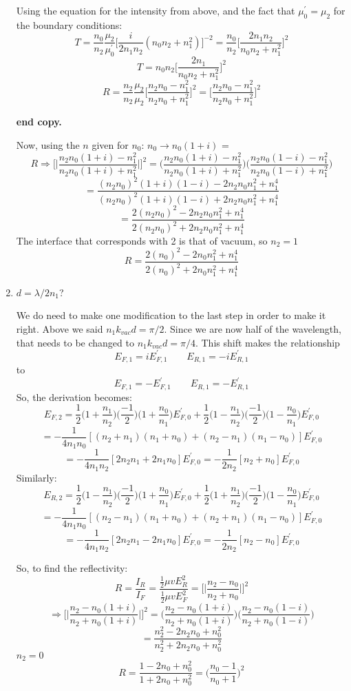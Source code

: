 \documentclass[12pt]{article}
\begin{document}
\begin{enumerate}[label=\alph*)]
Using the equation for the intensity from above, and the fact that $\mu^\prime_0 = \mu_2$ for the boundary conditions:
\[T = \frac{n_0}{n_2}\frac{\mu_2}{\mu^\prime_0}\Big[\frac{i}{2n_1n_2}(n_0n_2 + n_1^2)\Big]^{-2} = \frac{n_0}{n_2}\Big[\frac{2n_1n_2}{n_0n_2 + n_1^2}\Big]^{2}\]
\[T = n_0n_2\Big[\frac{2n_1}{n_0n_2 + n_1^2}\Big]^2\]
\[R = \frac{n_2}{n_2}\frac{\mu_2}{\mu_2}\Big[\frac{n_2n_0 - n_1^2}{n_2n_0 + n_1^2}\Big]^2 = \Big[\frac{n_2n_0 - n_1^2}{n_2n_0 + n_1^2}\Big]^2\]\smallskip

{\bf end copy.}

Now, using the $n$ given for $n_0$: $n_0 \rightarrow n_0(1+i)$
 = \[R \Rightarrow \Big[\Big|\frac{n_2 n_0 (1+i) - n_1^2}{n_2 n_0(1+i) + n_1^2} \Big|\Big]^2 =\Big(\frac{n_2 n_0(1+i) - n_1^2}{n_2n_0(1+i) + n_1^2}\Big)\Big(\frac{n_2n_0(1-i)-n_1^2}{n_2n_0(1-i) + n_1^2}\Big)\]
\[= \frac{(n_2n_0)^2(1+i)(1-i) - 2n_2n_0n_1^2 +n_1^4}{(n_2n_0)^2(1+i)(1-i) + 2n_2n_0n_1^2 +n_1^4}\]
\[= \frac{2(n_2n_0)^2 - 2n_2n_0n_1^2 +n_1^4}{2(n_2n_0)^2 + 2n_2n_0n_1^2 +n_1^4}\]
The interface that corresponds with 2 is that of vacuum, so $n_2 = 1$
\[\boxed{R = \frac{2(n_0)^2 - 2n_0n_1^2 +n_1^4}{2(n_0)^2 + 2n_0n_1^2 +n_1^4}}\]

\item $d = \lambda/2n_1$?

We do need to make one modification to the last step in order to make it right. Above we said $n_1k_{vac}d = \pi/2$. Since we are now half of the wavelength, that needs to be changed to $n_1k_{vac}d = \pi/4$. This shift makes the relationship
\[E_{F,1} = iE_{F,1}^\prime \qquad E_{R,1} = -iE_{R,1}^\prime\]
to 
\[E_{F,1} = -E_{F,1}^\prime \qquad E_{R,1} = -E_{R,1}^\prime\]
So, the derivation becomes:
\[E_{F, 2} = \frac{1}{2}\Big(1 + \frac{n_1}{n_2}\Big)\Big(\frac{-1}{2}\Big)\Big(1 + \frac{n_0}{n_1}\Big)E_{F,0}^\prime + \frac{1}{2}\Big(1 - \frac{n_1}{n_2}\Big)\Big(\frac{-1}{2}\Big)\Big(1 - \frac{n_0}{n_1}\Big)E_{F,0}^\prime \]
\[= -\frac{1}{4n_1n_0}[(n_2 + n_1)(n_1 + n_0) + (n_2 - n_1)(n_1-n_0)]E_{F,0}^\prime\]
\[= -\frac{1}{4n_1n_2}[2n_2n_1 + 2n_1n_0]E_{F,0}^\prime = -\frac{1}{2n_2}[n_2 + n_0]E_{F,0}^\prime\]
Similarly:
\[E_{R, 2} = \frac{1}{2}\Big(1 - \frac{n_1}{n_2}\Big)\Big(\frac{-1}{2}\Big)\Big(1 + \frac{n_0}{n_1}\Big)E_{F,0}^\prime + \frac{1}{2}\Big(1 + \frac{n_1}{n_2}\Big)\Big(\frac{-1}{2}\Big)\Big(1 - \frac{n_0}{n_1}\Big)E_{F,0}^\prime \]
\[= -\frac{1}{4n_1n_0}[(n_2 - n_1)(n_1 + n_0) + (n_2 + n_1)(n_1-n_0)]E_{F,0}^\prime\]
\[= -\frac{1}{4n_1n_2}[2n_2n_1 - 2n_1n_0]E_{F,0}^\prime = -\frac{1}{2n_2}[n_2 - n_0]E_{F,0}^\prime\]

So, to find the reflectivity:
\[R = \frac{I_R}{I_F} = \frac{\frac{1}{2}\mu v E_R^2}{\frac{1}{2}\mu v E_F^2} = \Big[\Big|\frac{n_2 - n_0}{n_2 + n_0}\Big|\Big]^2\]
\[ \Rightarrow \Big[\Big| \frac{n_2 - n_0(1+i)}{n_2 + n_0(1+i)}\Big|\Big]^2 = \Big(\frac{n_2 - n_0(1+i)}{n_2 + n_0(1+i)}\Big)\Big(\frac{n_2 - n_0(1-i)}{n_2 + n_0(1-i)}\Big)\]
\[= \frac{n_2^2 - 2n_2n_0 +n_0^2}{n_2^2 + 2n_2n_0 +n_0^2}\]
$n_2 =0$
\[\boxed{R = \frac{1 - 2n_0 +n_0^2}{1 + 2n_0 +n_0^2} = \Big(\frac{n_0 - 1}{n_0 +1}\Big)^2}\]


\end{enumerate}
\end{document}
